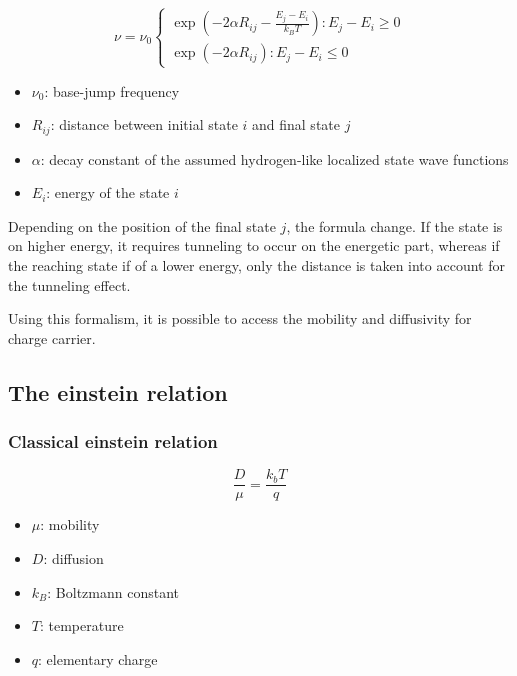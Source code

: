\begin{equation}
    \nu=\nu_{0}\left\{\begin{array}{r}
    \exp \left(-2 \alpha R_{i j}-\frac{E_{j}-E_{i}}{k_{B} T}\right): E_{j}-E_{i} \geq 0 \\
    \exp \left(-2 \alpha R_{i j}\right): E_{j}-E_{i} \leq 0
    \end{array}\right.
    \label{eq:1}
\end{equation}

\begin{itemize}
    \setlength\itemsep{0.1em}
    \item $\nu_0$: base-jump frequency
    \item $R_{i j}$: distance between initial state $i$ and final state $j$
    \item $\alpha$: decay constant of the assumed hydrogen-like localized state wave functions
    \item $E_i$: energy of the state $i$
\end{itemize}

Depending on the position of the final state $j$, the formula change. If the state is on higher energy, it requires tunneling to occur on the energetic part, whereas if the reaching state if of a lower energy, only the distance is taken into account for the tunneling effect.

Using this formalism, it is possible to access the mobility and diffusivity for charge carrier.

\subsection{The einstein relation}

\subsubsection{Classical einstein relation}

\begin{equation}
    \frac{D}{\mu} = \frac{k_bT}{q}
    \label{eq:2}
\end{equation}

\begin{itemize}
    \setlength\itemsep{0.0em}
    \item $\mu$: mobility
    \item $D$: diffusion
    \item $k_B$: Boltzmann constant
    \item $T$: temperature
    \item $q$: elementary charge
\end{itemize}

